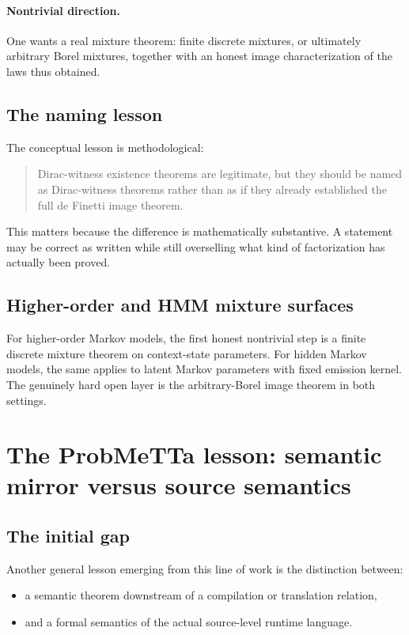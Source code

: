 \documentclass[11pt]{article}
\begin{document}
\paragraph{Nontrivial direction.}
One wants a real mixture theorem: finite discrete mixtures, or ultimately
arbitrary Borel mixtures, together with an honest image characterization of the
laws thus obtained.

\subsection{The naming lesson}

The conceptual lesson is methodological:
\begin{quote}
Dirac-witness existence theorems are legitimate, but they should be named as
Dirac-witness theorems rather than as if they already established the full de
Finetti image theorem.
\end{quote}

This matters because the difference is mathematically substantive.  A statement
may be correct as written while still overselling what kind of factorization has
actually been proved.

\subsection{Higher-order and HMM mixture surfaces}

For higher-order Markov models, the first honest nontrivial step is a finite
discrete mixture theorem on context-state parameters.  For hidden Markov
models, the same applies to latent Markov parameters with fixed emission
kernel.  The genuinely hard open layer is the arbitrary-Borel image theorem in
both settings.

\section{The ProbMeTTa lesson: semantic mirror versus source semantics}

\subsection{The initial gap}

Another general lesson emerging from this line of work is the distinction
between:
\begin{itemize}
  \item a semantic theorem downstream of a compilation or translation relation,
  \item and a formal semantics of the actual source-level runtime language.
\end{itemize}
\end{document}
